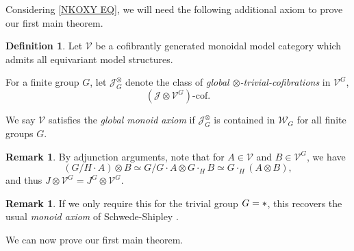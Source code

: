 \documentclass[a4paper,10pt
,draft
]{article}%
\numberwithin{equation}{section}
\numberwithin{figure}{section}
\theoremstyle{definition} %
\newtheorem{definition}[equation]{Definition}%
\newtheorem{remark}[equation]{Remark}%
\newcommand{\V}{\ensuremath{\mathcal V}}
\newcommand{\1}{\ensuremath{\mathbbm 1}}%
\begin{document}
Considering \eqref{NKOXY EQ}, we will need the following additional axiom to prove our first main theorem.

\begin{definition}
      \label{GLOBMONAX_DEF}
      Let $\V$ be a cofibrantly generated monoidal model category which admits all equivariant model structures.

      For a finite group $G$, let $\mathcal J^{\otimes}_G$ denote the class of \textit{global $\otimes$-trivial-cofibrations} in $\V^G$,
      \begin{equation}
            \label{GLOBMONAX_EQ}
            \left( \mathcal J \otimes \V^G \right) \text{-cof}.
      \end{equation}
      
      We say $\V$ satisfies the \textit{global monoid axiom} if $\mathcal J^{\otimes}_G$ is contained in $\mathcal W_G$ for all finite groups $G$.
\end{definition}

\begin{remark}
      By adjunction arguments, note that for $A \in \V$ and $B \in \V^G$, we have
      \[
            (G/H \cdot A) \otimes B \simeq G/G \cdot A \otimes G \cdot_H B \simeq G \cdot_H (A \otimes B),
      \]
      and thus $J \otimes \V^G = J^G \otimes \V^G$.
\end{remark}




\begin{remark}
      \label{MONAX_REM}
      If we only require this for the trivial group $G = \**$, this recovers the usual \textit{monoid axiom} of Schwede-Shipley \cite{SS00}.
\end{remark}

We can now prove our first main theorem.
\end{document}
